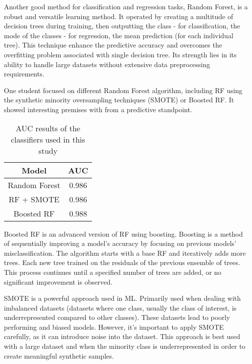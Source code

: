 \documentclass[../../../main.tex]{subfiles}
\begin{document}
Another good method for classification and regression tasks, Random Forest, is a robust and versatile learning method. It operated by creating a multitude of decision trees during training, then outputting the class - for classification, the mode of the classes - for regression, the mean prediction (for each individual tree).
This technique enhance the predictive accuracy and overcomes the overfitting problem associated with single decision tree.
Its strength lies in its ability to handle large datasets without extensive data preprocessing requirements. 

One student focused on different Random Forest algorithm, including RF using the synthetic minority oversampling techniques (SMOTE) or Boosted RF. It showed interesting premises with from a predictive standpoint. \cite{lee_machine_2019}
\begin{table}[H]
    \centering
    \caption{AUC results of the classifiers used in this study\cite{lee_machine_2019}}
    \begin{tabular}{|c|c|}
        \hline
        \textbf{Model} & \textbf{AUC}\\
        \hline
        Random Forest & 0.986 \\
        \hline
        RF + SMOTE & 0.986\\
        \hline
        Boosted RF & 0.988 \\
        \hline
    \end{tabular}
    \label{tab:auc_values_lee}
\end{table}

Boosted RF is an advanced version of RF using boosting. Boosting is a method of sequentially improving a model's accuracy by focusing on previous models' misclassification. The algorithm starts with a base RF and iteratively adds more trees. Each new tree trained on the residuals of the previous ensemble of trees. This process continues until a specified number of trees are added, or no significant improvement is observed.

SMOTE is a powerful approach used in ML. Primarily used when dealing with imbalanced datasets (datasets where one class, usually the class of interest, is underrepresented compared to other classes). These datasets lead to poorly performing and biased models.
However, it's important to apply SMOTE carefully, as it can introduce noise into the dataset. This approach is best used with a large dataset and when the minority class is underrepresented in order to create meaningful synthetic samples.
\end{document}
